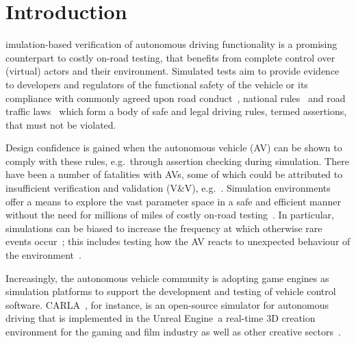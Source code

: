 \documentclass[letterpaper, 10 pt, journal, twoside]{IEEEtran}
\providecommand{\DIFaddtex}[1]{{\protect\color{blue}\uwave{#1}}} %
\providecommand{\DIFaddbegin}{} %
\providecommand{\DIFaddend}{} %
\providecommand{\DIFadd}[1]{\texorpdfstring{\DIFaddtex{#1}}{#1}} %
\begin{document}
\section{Introduction} \label{s:introduction}
%
imulation-based verification of autonomous driving functionality is a promising counterpart to costly on-road testing, that benefits from complete control over (virtual) actors and their environment.
%
Simulated tests aim to provide evidence to developers and regulators of the functional safety of the vehicle or its compliance with commonly agreed upon road conduct~\cite{ViennaConv}, national rules~\cite{codes2015highway} and road traffic laws~\cite{RoadTraffic1988} which form a body of safe and legal driving rules, termed assertions, that must not be violated. 

Design confidence is gained when the autonomous vehicle (AV) can be shown to comply with these rules, e.g.\ through assertion checking during simulation. 
There have been a number of fatalities with AVs, some of which could be attributed to insufficient verification and validation (V\&V), e.g.~\cite{FatalityExample}. Simulation environments offer a means to explore the vast parameter space in a safe and efficient manner~\cite{korosec2019waymo} without the need for millions of miles of costly on-road testing~\cite{kalra2016driving}. In particular, simulations can be biased to increase the frequency at which otherwise rare events occur~\cite{Koopman2018}; this includes testing how the AV reacts to unexpected behaviour of the environment~\cite{RobustnessAutonomy}. 

Increasingly, the autonomous vehicle community is adopting game engines as simulation platforms to support the development and testing of vehicle control software. 
%
CARLA~\cite{carla_main_website}, for instance, is an open-source simulator for autonomous driving that is implemented in the Unreal Engine~\cite{UE4_main_website}\DIFaddbegin \DIFadd{, }\DIFaddend a real-time 3D creation environment for the gaming and film industry as well as other creative sectors~\cite{CARLA_paper}. 
\end{document}
